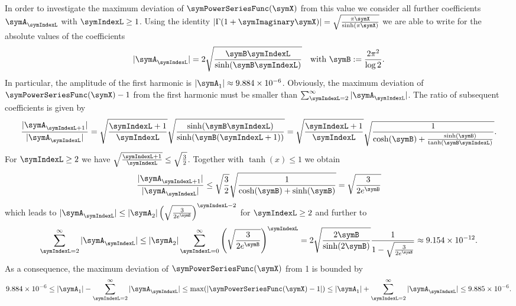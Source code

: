 \documentclass[a4paper]{scrartcl}
\begin{document}
In order to investigate the maximum deviation of $\symPowerSeriesFunc(\symX)$ from this value we consider all further coefficients $\symA_\symIndexL$ with $\symIndexL\geq 1$. Using the identity $\left|\Gamma(1+\symImaginary\symX)\right| = 
\sqrt{\frac{\pi\symX}{\sinh(\pi\symX)}}
$
we are able to write for the absolute values of the coefficients
\begin{equation}
|\symA_\symIndexL| = 
2\sqrt{\frac{\symB\symIndexL}{\sinh(\symB\symIndexL)}}
\quad
\text{with}
\
\symB:=\frac{2\pi^2}{\log 2}.
\end{equation}
In particular, the amplitude of the first harmonic is 
$|\symA_1|
\approx
\num{9.884e-6}$. Obviously, the maximum deviation of $\symPowerSeriesFunc(\symX)-1$ from the first harmonic must be smaller than $\sum_{\symIndexL=2}^{\infty} 
|\symA_\symIndexL|$. The ratio of subsequent coefficients is given by
\begin{equation}
\frac{|\symA_{\symIndexL+1}|}{|\symA_{\symIndexL}|}
=
\sqrt{\frac{\symIndexL+1}{\symIndexL}}
\sqrt{\frac{
\sinh(\symB \symIndexL)
}{
\sinh(\symB (\symIndexL+1))
}}
=
\sqrt{\frac{\symIndexL+1}{\symIndexL}}
\sqrt{\frac{
1
}{
\cosh(\symB)
+
\frac{
\sinh(\symB)
}
{
\tanh(\symB \symIndexL)
}
}}.
\end{equation}
For $\symIndexL\geq 2$ we have $\sqrt{\frac{\symIndexL+1}{\symIndexL}}\leq \sqrt{\frac{3}{2}}$. Together with $\tanh(x)\leq 1$ we obtain
\begin{equation}
\frac{|\symA_{\symIndexL+1}|}{
|\symA_{\symIndexL}|
}
\leq
\sqrt{\frac{3}{2}}
\sqrt{\frac{
1
}{
\cosh(\symB)
+
\sinh(\symB)
}}
\\
=
\sqrt{\frac{
3
}{
2 e^\symB
}}
\end{equation}
which leads to $|\symA_{\symIndexL}| \leq 
|\symA_{2}|
\left(\sqrt{\frac{
3
}{
2 e^\symB
}}\right)^{\symIndexL-2}$ for $\symIndexL\geq 2$ and further to
\begin{equation}
\sum_{\symIndexL=2}^{\infty} 
|\symA_\symIndexL|
\leq
|\symA_2|
\sum_{\symIndexL=0}^{\infty} 
\left(
\sqrt{\frac{
3
}{
2e^\symB
}}
\right)^\symIndexL
=
2\sqrt{
\frac{2\symB}{\sinh(2\symB)}}
\frac{1}{1-
\sqrt{\frac{
3
}{
2 e^\symB
}}
}
\approx
\num{9.154e-12}.
\end{equation}
As a consequence, the maximum deviation of $\symPowerSeriesFunc(\symX)$ from 1 is bounded by
\begin{equation}
\num{9.884e-6}
\leq
|\symA_1|
-
\sum_{\symIndexL=2}^{\infty} 
|\symA_\symIndexL|
\leq
\max(|\symPowerSeriesFunc(\symX)-1|) 
\leq 
|\symA_1|
+
\sum_{\symIndexL=2}^{\infty} 
|\symA_\symIndexL|
\leq 
\num{9.885e-6}.
\end{equation}
\end{document}
